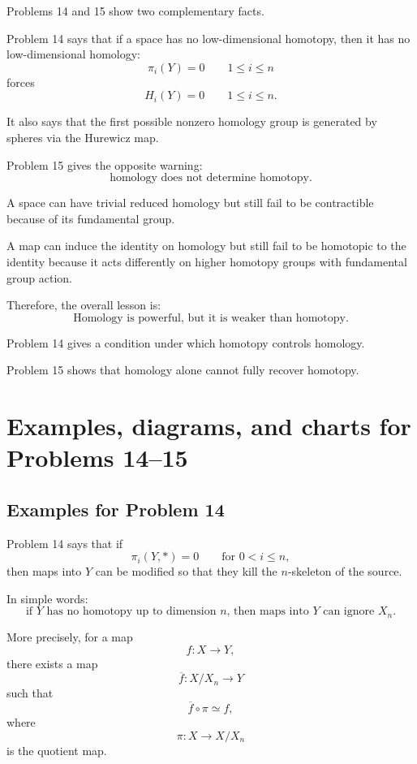 \documentclass[12pt,a4paper]{article}
\theoremstyle{notespace}
\begin{document}
Problems 14 and 15 show two complementary facts.

Problem 14 says that if a space has no low-dimensional homotopy, then it has no low-dimensional homology:
\[
\pi_i(Y)=0
\qquad
1\leq i\leq n
\]
forces
\[
H_i(Y)=0
\qquad
1\leq i\leq n.
\]

It also says that the first possible nonzero homology group is generated by spheres via the Hurewicz map.

Problem 15 gives the opposite warning:
\[
\text{homology does not determine homotopy.}
\]

A space can have trivial reduced homology but still fail to be contractible because of its fundamental group.

A map can induce the identity on homology but still fail to be homotopic to the identity because it acts differently on higher homotopy groups with fundamental group action.

Therefore, the overall lesson is:
\[
\boxed{
	\text{Homology is powerful, but it is weaker than homotopy.}
}
\]

Problem 14 gives a condition under which homotopy controls homology.

Problem 15 shows that homology alone cannot fully recover homotopy.



\section{Examples, diagrams, and charts for Problems 14--15}

\subsection{Examples for Problem 14}

Problem 14 says that if
\[
\pi_i(Y,*)=0
\qquad
\text{for }0<i\leq n,
\]
then maps into \(Y\) can be modified so that they kill the \(n\)-skeleton of the source.

In simple words:
\[
\text{if \(Y\) has no homotopy up to dimension \(n\), then maps into \(Y\) can ignore \(X_n\).}
\]

More precisely, for a map
\[
f:X\to Y,
\]
there exists a map
\[
\overline f:X/X_n\to Y
\]
such that
\[
\overline f\circ \pi\simeq f,
\]
where
\[
\pi:X\to X/X_n
\]
is the quotient map.
\end{document}
